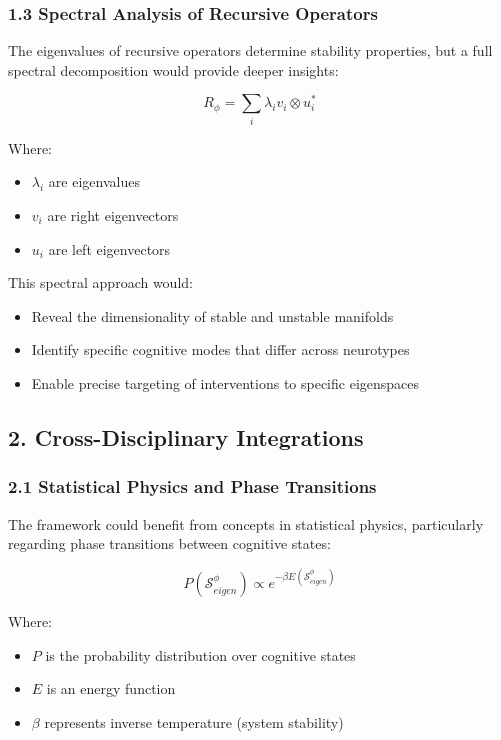 \documentclass[
]{article}
\providecommand{\tightlist}{%
  \setlength{\itemsep}{0pt}\setlength{\parskip}{0pt}}
\begin{document}
\subsubsection{1.3 Spectral Analysis of Recursive
Operators}\label{spectral-analysis-of-recursive-operators}

The eigenvalues of recursive operators determine stability properties,
but a full spectral decomposition would provide deeper insights:

\[R_{\phi} = \sum_i \lambda_i v_i \otimes u_i^*\]

Where:

\begin{itemize}
\tightlist
\item
  \(\lambda_i\) are eigenvalues
\item
  \(v_i\) are right eigenvectors
\item
  \(u_i\) are left eigenvectors
\end{itemize}

This spectral approach would:

\begin{itemize}
\tightlist
\item
  Reveal the dimensionality of stable and unstable manifolds
\item
  Identify specific cognitive modes that differ across neurotypes
\item
  Enable precise targeting of interventions to specific eigenspaces
\end{itemize}

\subsection{2. Cross-Disciplinary
Integrations}\label{cross-disciplinary-integrations}

\subsubsection{2.1 Statistical Physics and Phase
Transitions}\label{statistical-physics-and-phase-transitions}

The framework could benefit from concepts in statistical physics,
particularly regarding phase transitions between cognitive states:

\[P(\mathcal{S}_{eigen}^{\phi}) \propto e^{-\beta E(\mathcal{S}_{eigen}^{\phi})}\]

Where:

\begin{itemize}
\tightlist
\item
  \(P\) is the probability distribution over cognitive states
\item
  \(E\) is an energy function
\item
  \(\beta\) represents inverse temperature (system stability)
\end{itemize}
\end{document}
